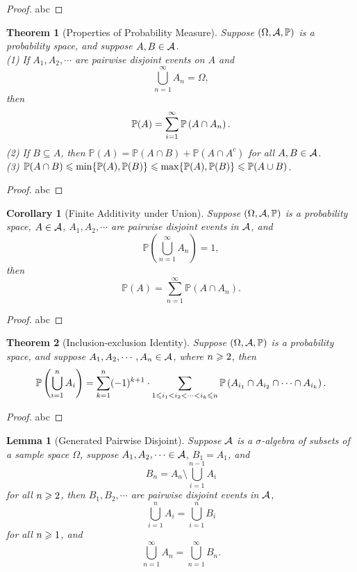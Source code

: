 \documentclass[openany,12pt]{book}
\newtheorem{theorem}{Theorem}[chapter]
\newtheorem{corollary}{Corollary}[chapter]
\newtheorem{lemma}{Lemma}[chapter]
\begin{document}
\begin{proof}
  abc
\end{proof}

\begin{theorem}[Properties of Probability Measure]
  Suppose $(\Omega,\mathcal{A},\mathbb{P})$ is a probability space, and suppose $A,B\in\mathcal{A}$.
  \\
  (1) If $A_1,A_2,\cdots$ are pairwise disjoint events on $A$ and
  $$ \bigcup_{n=1}^\infty A_n =\Omega,$$ then
  $$\mathbb{P}(A)= \sum_{i=1}^{\infty} \mathbb{P}\left(A \cap A_n \right).$$
  (2) If $B\subseteq A$, then $\mathbb{P}(A)=\mathbb{P}(A\cap B)+\mathbb{P}(A\cap A^c)$ for all $A,B\in\mathcal{A}$.\\
  (3) $\mathbb{P}(A\cap B)  \leqslant \min \{\mathbb{P}(A),\mathbb{P}(B)\}  \leqslant \max\{ \mathbb{P}(A),\mathbb{P}(B)\} \leqslant  \mathbb{P}(A\cup B)$.
\end{theorem}

\begin{proof}
  abc
\end{proof}

\begin{corollary}[Finite Additivity under Union]
  Suppose $(\Omega,\mathcal{A},\mathbb{P})$ is a probability space, $A\in\mathcal{A}$, $A_1,A_2,\cdots$ are pairwise disjoint events in $\mathcal{A}$, and $$\mathbb{P}\left(\bigcup_{n=1}^\infty A_n \right)=1,$$ then
  $$\mathbb{P}(A)=\sum_{n=1}^\infty \mathbb{P}\left(A\cap A_n \right).$$
\end{corollary}

\begin{proof}
  abc
\end{proof}

\begin{theorem}[Inclusion-exclusion Identity]
  Suppose $(\Omega,\mathcal{A},\mathbb{P})$ is a probability space, and suppose $A_1,A_2, \cdots,A_n\in\mathcal{A} $, where $n \geqslant2$, then $$\mathbb{P}\left(\bigcup_{i=1}^n A_i \right)=\sum_{k=1}^n(-1)^{k+1}\cdot  \sum_{1\leqslant i_1<i_2<\cdots<i_k\leqslant n}\mathbb{P}\left(A_{i_1} \cap A_{i_2 } \cap\cdots\cap A_{i_k } \right).$$
\end{theorem}

\begin{proof}
  abc
\end{proof}

\begin{lemma}[Generated Pairwise Disjoint]
  Suppose $\mathcal{A}$ is a $\sigma$-algebra of subsets of a sample space $\Omega$, suppose $A_1,A_2,\cdots\in\mathcal{A}$, $B_1=A_1$, and $$B_n=A_n\setminus\bigcup_{i=1}^{n-1}A_i$$  for all $n\geqslant2$, then $B_1,B_2,\cdots$ are pairwise disjoint events in $\mathcal{A}$, $$\bigcup_{i=1}^nA_i =\bigcup_{i=1}^nB_i$$  for all $n\geqslant1$, and $$\bigcup_{n=1}^\infty A_n =\bigcup_{n=1}^\infty B_n.$$
\end{lemma}
\end{document}
